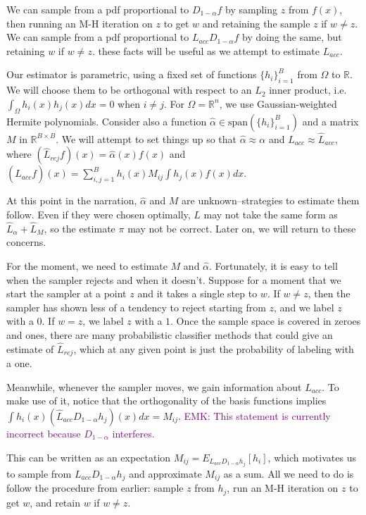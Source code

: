 \documentclass{article}
\newcommand\EMK[1]{\textcolor{purple}{EMK: #1}}
\begin{document}
We can sample from a pdf proportional to $D_{1-\alpha}f$ by sampling $z$ from $f(x)$, then running an M-H iteration on $z$ to get $w$ and retaining the sample $z$ if $w \neq z$. We can sample from a pdf proportional to $L_{acc}D_{1-\alpha}f$ by doing the same, but retaining $w$ if $w \neq z$. these facts will be useful as we attempt to estimate $L_{acc}$.

Our estimator is parametric, using a fixed set of functions $\{h_i\}_{i=1}^B$ from $\Omega$ to $\mathbb{R}$. We will choose them to be orthogonal with respect to an $L_2$ inner product, i.e. $\int_{\Omega} h_i(x)h_j(x)dx = 0$ when $i \neq j$. For $\Omega=\mathbb{R}^n$, we use Gaussian-weighted Hermite polynomials. Consider also a function $\hat{\alpha} \in \text{span}(\{h_i\}_{i=1}^B)$ and a matrix $M$ in $\mathbb{R}^{B\times B}$.  We will attempt to set things up so that $\hat{\alpha}\approx{\alpha}$ and $L_{acc} \approx \hat{L}_{acc}$, where $ (\hat{L}_{rej}f)(x) = \hat{\alpha}(x)f(x)$ and $(\hat{L}_{acc}f)(x) =\sum_{i,j=1}^B h_i(x)M_{ij}\int h_j(x)f(x)dx$. 


At this point in the narration, $\hat{\alpha}$ and $M$ are unknown--strategies to estimate them follow. Even if they were chosen optimally, $L$ may not take the same form as $\hat{L}_{\alpha}+\hat{L}_{M}$, so the estimate $\pi$ may not be correct. Later on, we will return to these concerns.

For the moment, we need to estimate $M$ and $\hat{\alpha}$. Fortunately, it is easy to tell when the sampler rejects and when it doesn't. Suppose for a moment that we start the sampler at a point $z$ and it takes a single step to $w$. If $w \neq z$, then the sampler has shown less of a tendency to reject starting from $z$, and we label $z$ with a $0$. If $w = z$, we label $z$ with a $1$. Once the sample space is covered in zeroes and ones, there are many probabilistic classifier methods that could give an estimate of $\hat{L}_{rej}$, which at any given point is just the probability of labeling with a one. 

Meanwhile, whenever the sampler moves, we gain information about $L_{acc}$. To make use of it, notice that the orthogonality of the basis functions implies $\int h_i(x)(\hat{L}_{acc}D_{1-\alpha}h_j)(x)dx =  M_{ij}$. \EMK{This statement is currently incorrect because $D_{1-\alpha}$ interferes.}

This can be written as an expectation $M_{ij} = E_{L_{acc}D_{1-\alpha}h_j}[h_i]$, which motivates us to sample from $L_{acc}D_{1-\alpha}h_j$ and approximate $M_{ij}$ as a sum. All we need to do is follow the procedure from earlier: sample $z$ from $h_j$, run an M-H iteration on $z$ to get $w$, and retain $w$ if $w \neq z$. 
\end{document}
